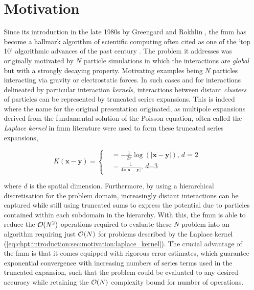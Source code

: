 \section{Motivation}\label{chpt:introduction:sec:motivation}




Since its introduction in the late 1980s by Greengard and Rokhlin \cite{greengard1987fast}, the \acrfull{fmm} has become a hallmark algorithm of scientific computing often cited as one of the `top 10' algorithmic advances of the past century \cite{cipra2000best}. The problem it addresses was originally motivated by $N$ particle simulations in which the interactions are \textit{global} but with a strongly decaying property. Motivating examples being $N$ particles interacting via gravity or electrostatic forces. In such cases and for interactions delineated by particular interaction \textit{kernels}, interactions between distant \textit{clusters} of particles can be represented by truncated series expansions. This is indeed where the name for the original presentation originated, as multipole expansions derived from the fundamental solution of the Poisson equation, often called the \textit{Laplace kernel} in \acrshort{fmm} literature were used to form these truncated series expansions,


\begin{equation}
    K(\mathbf{x-y}) =  \begin{cases}
        &= -\frac{1}{2\pi} \log(|\mathbf{x-y}|) \text{, $d$ = 2} \\
        &= \frac{1}{4\pi | \mathbf{x-y}|} \text{, $d$=3 }
    \end{cases}
    \label{eq:chpt:introduction:sec:motivation:laplace_kernel}
\end{equation}


where $d$ is the spatial dimension. Furthermore, by using a hierarchical discretisation for the problem domain, increasingly distant interactions can be captured while still using truncated sums to express the potential due to particles contained within each subdomain in the hierarchy. With this, the \acrshort{fmm} is able to reduce the $\mathcal{O}(N^2)$ operations required to evaluate these $N$ problem into an algorithm requiring just $\mathcal{O}(N)$ for problems described by the Laplace kernel (\ref{eq:chpt:introduction:sec:motivation:laplace_kernel}). The crucial advantage of the \acrshort{fmm} is that it comes equipped with rigorous error estimates, which guarantee exponential convergence with increasing numbers of series terms used in the truncated expansion, such that the problem could be evaluated to any desired accuracy while retaining the $\mathcal{O}(N)$ complexity bound for number of operations.

